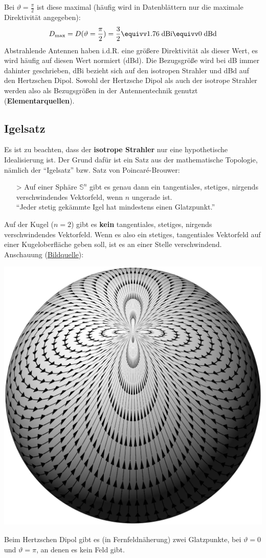 Bei $\vartheta=\frac{\pi}{2}$ ist diese maximal (häufig wird in Datenblättern nur die maximale Direktivität angegeben):
\begin{equation}
		        D_\mathrm{max} = D(\vartheta=\frac{\pi}{2}) = \frac{3}{2} \equivv 1.76\; \text{dBi} \equivv 0\; \text{dBd}
\end{equation}
Abstrahlende Antennen haben i.d.R. eine größere Direktivität als dieser Wert, es wird häufig auf diesen Wert normiert (dBd). Die Bezugsgröße wird bei dB immer dahinter geschrieben, dBi bezieht sich auf den isotropen Strahler und dBd auf den Hertzschen Dipol. Sowohl der Hertzsche Dipol als auch der isotrope Strahler werden also als Bezugsgrößen in der Antennentechnik genutzt (\textbf{Elementarquellen}). 
\subsection{Igelsatz}\label{igelsatz}
		  Es ist zu beachten, dass der \textbf{isotrope Strahler} nur eine hypothetische Idealisierung ist. Der Grund dafür ist ein Satz aus der mathematische Topologie, nämlich der \enquote{Igelsatz} bzw. Satz von Poincaré-Brouwer:
		\begin{itemize}
			\item[>] Auf einer Sphäre \(\mathbb{S}^{n}\) gibt es genau dann ein tangentiales, stetiges, nirgends verschwindendes Vektorfeld, wenn \(n\) ungerade ist.\\
			\enquote{Jeder stetig gekämmte Igel hat mindestens einen Glatzpunkt.}
		\end{itemize}
		   Auf der Kugel (\(n=2\)) gibt es \textbf{kein} tangentiales, stetiges, nirgends verschwindendes Vektorfeld. Wenn es also ein stetiges, tangentiales Vektorfeld auf einer Kugeloberfläche geben soll, ist es an einer Stelle verschwindend. Anschauung (\href{https://commons.wikimedia.org/wiki/File:Hairy_ball_one_pole.jpg}{Bildquelle}):
		   \begin{center}
		   	\includegraphics[width=.3\textwidth]{res/Hairy_ball_one_pole}
		   \end{center} 
		   Beim Hertzschen Dipol gibt es (in Fernfeldnäherung) zwei Glatzpunkte, bei $\vartheta=0$ und $\vartheta=\pi$, an denen es kein Feld gibt.

